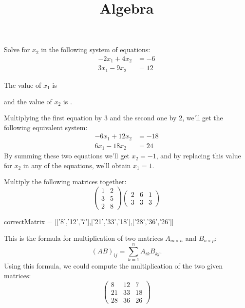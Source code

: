 \documentclass{ximera}
\title{Algebra}
\begin{document}
\maketitle

\begin{question}
Solve for $x_2$ in the following system of equations:
\begin{align*}
-2x_1 + 4x_2 &= -6\\
3x_1  - 9x_2 &=  12 
\end{align*}
\begin{solution}
The value of $x_1$ is 
\end{solution}
\begin{solution}
and the value of $x_2$ is .
\end{solution}
Multiplying the first equation by 3 and the second one by 2, we'll get the following equivalent system:
\begin{align*}
 -6  x_1  + 12  x_2 &= -18 \\
 6  x_1  - 18  x_2 &= 24
\end{align*}
By summing these two equations we'll get $x_2 = -1$, and by replacing
this value for $x_2$ in any of the equations, we'll obtain $x_1 = 1$.
\end{question}

\begin{question}
Multiply the following matrices together:
\[ 
\left( \begin{array}{cc}
1 & 2 \\
3 & 5 \\
2 & 8
\end{array} \right)
\left( \begin{array}{ccc}
2 & 6 & 1 \\
3 & 3 & 3
\end{array} \right)
\]
\begin{solution}
\begin{matrix-answer}[name=M]
    correctMatrix = [['8','12','7'],['21','33','18'],['28','36','26']]
\end{matrix-answer}
\end{solution}
This is the formula for multiplication of two matrices $A_{m \times n}$ and $B_{n \times p}$:
\[
    (AB)_{ij} = \sum_{k=1}^n A_{ik}B_{kj}. 
\]
Using this formula, we could compute the multiplication of the two given matrices:
\[
\begin{pmatrix}
8 & 12 & 7 \\
21 & 33 & 18 \\
28 & 36 & 26
\end{pmatrix}
\]
\end{question}
\end{document}

